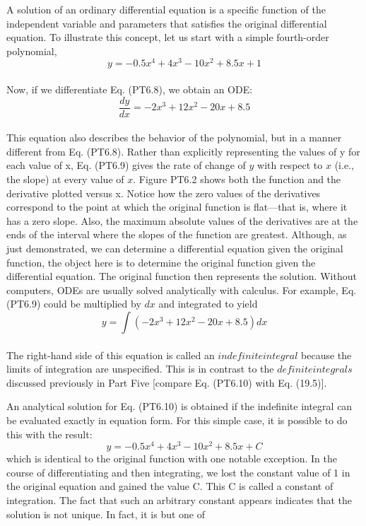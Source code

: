 \documentclass[../main.tex]{subfiles}
\begin{document}
A solution of an ordinary differential equation is a specific function of the independent
variable and parameters that satisfies the original differential equation. To illustrate this
concept, let us start with a simple fourth-order polynomial,\\
\begin{equation}
\tag{PT6.8}
y=-0.5x^4 + 4x^3 - 10x^2 + 8.5x + 1
\end{equation}\\
Now, if we differentiate Eq. (PT6.8), we obtain an ODE:
\begin{equation}
\tag{PT6.9}
\dfrac{dy}{dx} = -2x^3 + 12x^2 - 20x + 8.5
\end{equation}\\
This equation also describes the behavior of the polynomial, but in a manner different from
Eq. (PT6.8). Rather than explicitly representing the values of y for each value of x,
Eq. (PT6.9) gives the rate of change of $y$ with respect to $x$ (i.e., the slope) at every value of
$x$. Figure PT6.2 shows both the function and the derivative plotted versus x. Notice how the
zero values of the derivatives correspond to the point at which the original function is
flat—that is, where it has a zero slope. Also, the maximum absolute values of the derivatives are at the ends of the interval where the slopes of the function are greatest.
Although, as just demonstrated, we can determine a differential equation given the
original function, the object here is to determine the original function given the differential
equation. The original function then represents the solution. 
Without computers, ODEs are usually solved analytically with calculus. For example,
Eq. (PT6.9) could be multiplied by $dx$ and integrated to yield\\
\begin{equation}
\tag{PT6.10}
y= \int(-2x^3 + 12x^2 - 20x + 8.5)dx
\end{equation}\\
The right-hand side of this equation is called an $indefinite integral$ because the limits of integration are unspecified. This is in contrast to the $definite integrals$ discussed previously
in Part Five [compare Eq. (PT6.10) with Eq. (19.5)].

An analytical solution for Eq. (PT6.10) is obtained if the indefinite integral can be evaluated exactly in equation form. For this simple case, it is possible to do this with the result:\\
\begin{equation}
\tag{PT6.11}
y=-0.5x^4 + 4x^3 - 10x^2 + 8.5x + C
\end{equation}
\vspace{0.1 in}
which is identical to the original function with one notable exception. In the course of differentiating and then integrating, we lost the constant value of 1 in the original equation
and gained the value C. This C is called a constant of integration. The fact that such an
arbitrary constant appears indicates that the solution is not unique. In fact, it is but one of\\
\end{document}
